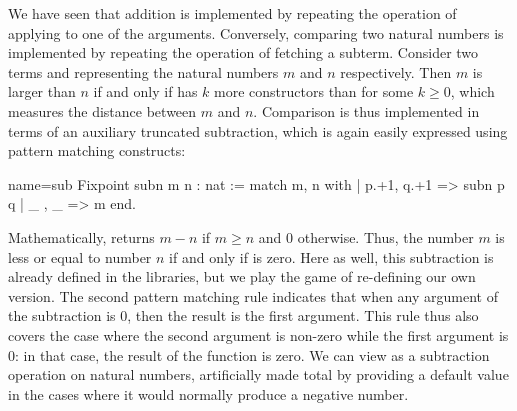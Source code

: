 %
%

We have seen that addition is implemented by repeating the operation
of applying  to one of the arguments. Conversely, comparing two
natural numbers is implemented by repeating the operation of fetching a
subterm. Consider two terms  and  representing the natural
numbers $m$ and $n$ respectively. Then $m$ is larger than $n$ if and only
if  has $k$ more constructors than  for some $k \geq
0$, which measures the distance between $m$ and $n$. Comparison is
thus implemented in terms of an auxiliary
truncated subtraction, which is again easily expressed using pattern
matching constructs:

\begin{coq}{name=sub}{}
Fixpoint subn m n : nat :=
  match m, n with
  | p.+1, q.+1 => subn p q
  | _ , _ => m
  end.
\end{coq}
Mathematically,  returns \(m-n\) if \(m \geq n\)
and \(0\) otherwise.
Thus, the number $m$ is less or equal to number $n$ if and only if
 is
zero. Here as well, this subtraction is already defined in the
libraries, but we play the game of re-defining our own version.
The second pattern matching rule indicates that when
any argument of the subtraction is 0, then the result is
the first argument.  This %
rule thus also covers the case where the
second argument is non-zero while the first argument is 0: in that
case, the result of the function is zero.  We can view
 as a subtraction operation on natural numbers, artificially
made total by providing a default value in the cases where it would
normally produce a negative number.

